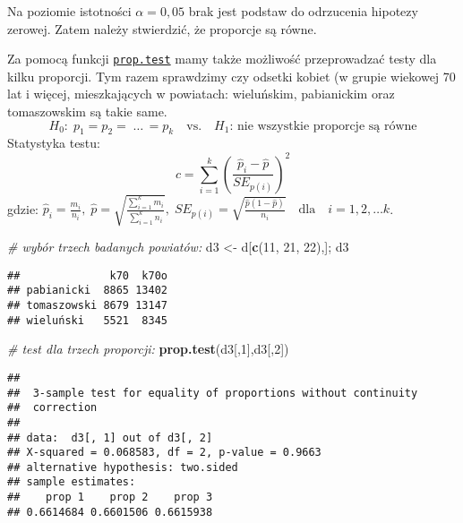 \documentclass[polish,]{book}
\newenvironment{Shaded}{\begin{snugshade}}{\end{snugshade}}
\newcommand{\CommentTok}[1]{\textcolor[rgb]{0.56,0.35,0.01}{\textit{#1}}}
\newcommand{\DecValTok}[1]{\textcolor[rgb]{0.00,0.00,0.81}{#1}}
\newcommand{\KeywordTok}[1]{\textcolor[rgb]{0.13,0.29,0.53}{\textbf{#1}}}
\newcommand{\NormalTok}[1]{#1}
\newcommand{\StringTok}[1]{\textcolor[rgb]{0.31,0.60,0.02}{#1}}
\begin{document}
Na poziomie istotności \(\alpha = 0,05\) brak jest podstaw do odrzucenia hipotezy zerowej. Zatem należy stwierdzić, że proporcje są równe.

Za pomocą funkcji \href{https://rdrr.io/r/stats/prop.test.html}{\texttt{prop.test}} mamy także możliwość przeprowadzać
testy dla kilku proporcji. Tym razem sprawdzimy czy odsetki kobiet (w grupie wiekowej 70 lat i więcej, mieszkających w powiatach: wieluńskim, pabianickim oraz
tomaszowskim są takie same.
\[
H_{0}:\;p_1=p_2=\;\dots\,=p_k\quad\mbox{vs.}\quad H_{1}:\,\mbox{nie wszystkie proporcje są równe}
\]
Statystyka testu:
\begin{equation}
c=\sum_{i=1}^{k}\left(\frac{\hat{p}_i-\hat{p}}{SE_{p(i)}}\right)^2
\label{eq:wz1168}
\end{equation}
gdzie: \(\hat{p}_i=\frac{m_i}{n_i},\;\hat{p}=\sqrt{\frac{\sum_{i=1}^{k}m_i}{\sum_{i=1}^{k}n_i}},\;SE_{p(i)}=\sqrt{\frac{\hat{p}(1-\hat{p})}{n_i}} \quad\mbox{dla}\quad i=1,2,\dots k\).

\begin{Shaded}
\begin{Highlighting}[]
\CommentTok{# wybór trzech badanych powiatów:}
\NormalTok{d3 <-}\StringTok{ }\NormalTok{d[}\KeywordTok{c}\NormalTok{(}\DecValTok{11}\NormalTok{, }\DecValTok{21}\NormalTok{, }\DecValTok{22}\NormalTok{),]; d3}
\end{Highlighting}
\end{Shaded}

\begin{verbatim}
##              k70  k70o
## pabianicki  8865 13402
## tomaszowski 8679 13147
## wieluński   5521  8345
\end{verbatim}

\begin{Shaded}
\begin{Highlighting}[]
\CommentTok{# test dla trzech proporcji:}
\KeywordTok{prop.test}\NormalTok{(d3[,}\DecValTok{1}\NormalTok{],d3[,}\DecValTok{2}\NormalTok{])}
\end{Highlighting}
\end{Shaded}

\begin{verbatim}
## 
##  3-sample test for equality of proportions without continuity
##  correction
## 
## data:  d3[, 1] out of d3[, 2]
## X-squared = 0.068583, df = 2, p-value = 0.9663
## alternative hypothesis: two.sided
## sample estimates:
##    prop 1    prop 2    prop 3 
## 0.6614684 0.6601506 0.6615938
\end{verbatim}
\end{document}
